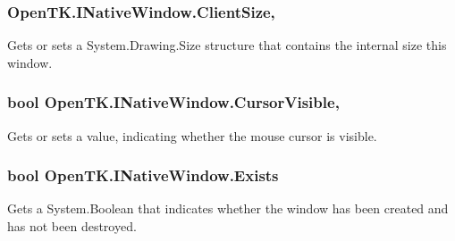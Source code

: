 \hypertarget{interface_open_t_k_1_1_i_native_window_a3944c60601079d09e524f455a993d6cf}{
\subsubsection[{Client\-Size}]{ Open\-T\-K.\-I\-Native\-Window.\-Client\-Size\hspace{0.3cm}{\ttfamily [get]}, {\ttfamily [set]}}}\label{interface_open_t_k_1_1_i_native_window_a3944c60601079d09e524f455a993d6cf}


Gets or sets a System.\-Drawing.\-Size structure that contains the internal size this window. 

\hypertarget{interface_open_t_k_1_1_i_native_window_a584d510ec285e8aadd8c523389a447ff}{
\subsubsection[{Cursor\-Visible}]{\setlength{\rightskip}{0pt plus 5cm}bool Open\-T\-K.\-I\-Native\-Window.\-Cursor\-Visible\hspace{0.3cm}{\ttfamily [get]}, {\ttfamily [set]}}}\label{interface_open_t_k_1_1_i_native_window_a584d510ec285e8aadd8c523389a447ff}


Gets or sets a value, indicating whether the mouse cursor is visible. 

\hypertarget{interface_open_t_k_1_1_i_native_window_af207962d0e6a21f4a280e66844cc3805}{
\subsubsection[{Exists}]{\setlength{\rightskip}{0pt plus 5cm}bool Open\-T\-K.\-I\-Native\-Window.\-Exists\hspace{0.3cm}{\ttfamily [get]}}}\label{interface_open_t_k_1_1_i_native_window_af207962d0e6a21f4a280e66844cc3805}


Gets a System.\-Boolean that indicates whether the window has been created and has not been destroyed. 

